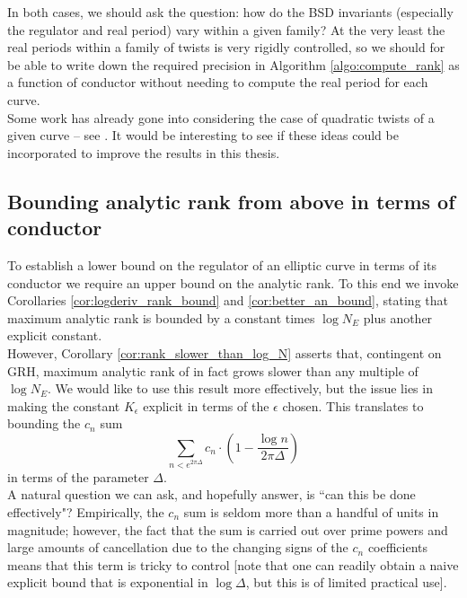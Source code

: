In both cases, we should ask the question: how do the BSD invariants (especially the regulator and real period) vary within a given family? At the very least the real periods within a family of twists is very rigidly controlled, so we should for be able to write down the required precision in Algorithm \ref{algo:compute_rank} as a function of conductor without needing to compute the real period for each curve. \\

Some work has already gone into considering the case of quadratic twists of a given curve -- see \cite{DeRo-2007}. It would be interesting to see if these ideas could be incorporated to improve the results in this thesis.

\subsection{Bounding analytic rank from above in terms of conductor}

To establish a lower bound on the regulator of an elliptic curve in terms of its conductor we require an upper bound on the analytic rank. To this end we invoke Corollaries \ref{cor:logderiv_rank_bound} and \ref{cor:better_an_bound}, stating that maximum analytic rank is bounded by a constant times $\log N_E$ plus another explicit constant. \\

However, Corollary \ref{cor:rank_slower_than_log_N} asserts that, contingent on GRH, maximum analytic rank of in fact grows slower than any multiple of $\log N_E$. We would like to use this result more effectively, but the issue lies in making the constant $K_\epsilon$ explicit in terms of the $\epsilon$ chosen. This translates to bounding the $c_n$ sum
\begin{equation}
\sum_{n < e^{2\pi \Delta}} c_n \cdot \left(1-\frac{\log n}{2\pi \Delta}\right)
\end{equation}
in terms of the parameter $\Delta$. \\

A natural question we can ask, and hopefully answer, is ``can this be done effectively"? Empirically, the $c_n$ sum is seldom more than a handful of units in magnitude; however, the fact that the sum is carried out over prime powers and large amounts of cancellation due to the changing signs of the $c_n$ coefficients means that this term is tricky to control [note that one can readily obtain a naive explicit bound that is exponential in $\log \Delta$, but this is of limited practical use]. \\

